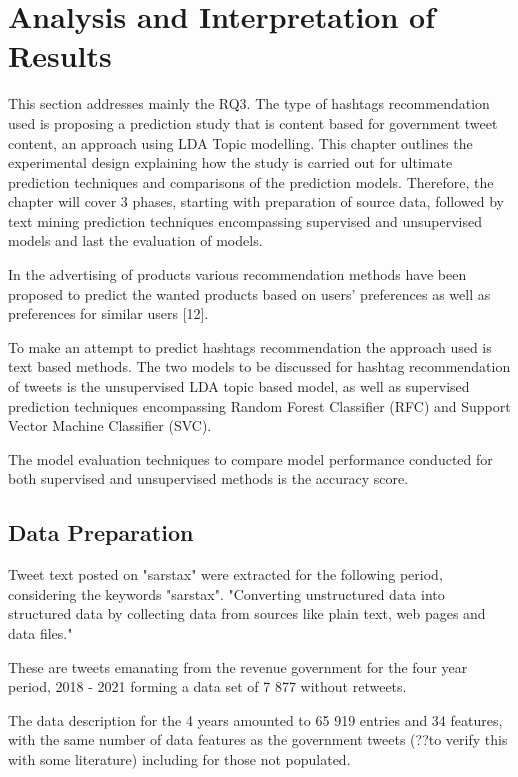\chapter{Analysis and Interpretation of Results}

This section addresses mainly the RQ3. The type of hashtags recommendation used is proposing a prediction study that is content based for government tweet content, an approach using LDA Topic modelling.  This chapter outlines the experimental design explaining how the study is carried out for ultimate prediction techniques and comparisons of the prediction models. Therefore, the chapter will cover 3 phases, starting with preparation of source data, followed by text mining prediction techniques encompassing supervised and unsupervised models and last the evaluation of models. 

In the advertising of products various recommendation methods have been proposed to predict the wanted products based on users’ preferences as well as preferences for similar users [12]. 

To make an attempt to predict hashtags recommendation the approach used is text based methods.   The two models to be discussed for hashtag recommendation of tweets is the unsupervised LDA topic based model, as well as supervised prediction techniques encompassing Random Forest Classifier (RFC) and Support Vector Machine Classifier (SVC).  

The model evaluation techniques to compare model performance conducted for both supervised and unsupervised methods is the accuracy score.  

\section{Data Preparation}

Tweet text posted on "sarstax" were extracted for the following period, considering the keywords "sarstax".
"Converting unstructured data into structured data by collecting data from sources like plain text, web pages and data files."

These are tweets emanating from the revenue government for the four year period, 2018 - 2021 forming a data set of 7 877 without retweets.

The data description for the 4 years amounted to 65 919 entries and 34 features, with the same number of data features as the government tweets (??to verify this with some literature) including for those not populated.

